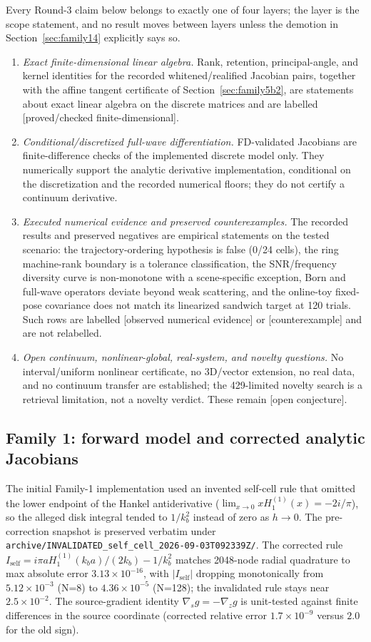 \documentclass[12pt]{article}
\newcommand{\FDL}{\textnormal{[proved/checked finite-dimensional]}}
\newcommand{\OBS}{\textnormal{[observed numerical evidence]}}
\newcommand{\OPN}{\textnormal{[open conjecture]}}
\newcommand{\CTX}{\textnormal{[counterexample]}}
\begin{document}
Every Round-3 claim below belongs to exactly one of four layers; the layer is
the scope statement, and no result moves between layers unless the demotion in
Section~\ref{sec:family14} explicitly says so.
\begin{enumerate}
\item \emph{Exact finite-dimensional linear algebra.} Rank, retention,
principal-angle, and kernel identities for the recorded whitened/realified
Jacobian pairs, together with the affine tangent certificate of
Section~\ref{sec:family5b2}, are statements about exact linear algebra on the
discrete matrices and are labelled \FDL{}.
\item \emph{Conditional/discretized full-wave differentiation.}
FD-validated Jacobians are finite-difference checks of the implemented
discrete model only. They numerically support the analytic derivative
implementation, conditional on the discretization and the recorded numerical
floors; they do not certify a continuum derivative.
\item \emph{Executed numerical evidence and preserved counterexamples.} The
recorded results and preserved negatives are empirical statements on the
tested scenario: the trajectory-ordering hypothesis is false (0/24 cells), the
ring machine-rank boundary is a tolerance classification, the SNR/frequency
diversity curve is non-monotone with a scene-specific exception, Born and
full-wave operators deviate beyond weak scattering, and the online-toy
fixed-pose covariance does not match its linearized sandwich target at 120
trials. Such rows are labelled \OBS{} or \CTX{} and are not relabelled.
\item \emph{Open continuum, nonlinear-global, real-system, and novelty
questions.} No interval/uniform nonlinear certificate, no 3D/vector
extension, no real data, and no continuum transfer are established; the
429-limited novelty search is a retrieval limitation, not a novelty verdict.
These remain \OPN{}.
\end{enumerate}

\subsection{Family 1: forward model and corrected analytic Jacobians}\label{sec:family1}

The initial Family-1 implementation used an invented self-cell rule that
omitted the lower endpoint of the Hankel antiderivative
($\lim_{x\to0}xH_1^{(1)}(x)=-2i/\pi$), so the alleged disk integral tended to
$1/k_b^2$ instead of zero as $h\to0$. The pre-correction snapshot is preserved
verbatim under \texttt{archive/INVALIDATED\_self\_cell\_2026-09-03T092339Z/}. The
corrected rule
$I_{\mathrm{self}}=i\pi a H_1^{(1)}(k_ba)/(2k_b)-1/k_b^2$ matches 2048-node
radial quadrature to max absolute error $3.13\times10^{-16}$, with
$|I_{\mathrm{self}}|$ dropping monotonically from $5.12\times10^{-3}$
(N=8) to $4.36\times10^{-5}$ (N=128); the invalidated rule stays near
$2.5\times10^{-2}$. The source-gradient identity
$\nabla_s g=-\nabla_z g$ is unit-tested against finite differences in the
source coordinate (corrected relative error $1.7\times10^{-9}$ versus
$2.0$ for the old sign).
\end{document}
